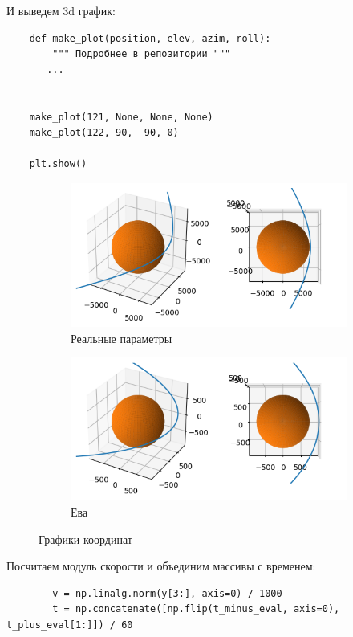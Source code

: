 \documentclass{article}
\begin{document}
    И выведем 3d график:
    \begin{verbatim}
    def make_plot(position, elev, azim, roll):
        """ Подробнее в репозитории """
       ...

       
    make_plot(121, None, None, None)
    make_plot(122, 90, -90, 0)
    
    plt.show()
    \end{verbatim}
    \begin{figure}
    \begin{subfigure}{0.5\textwidth}
        \includegraphics[width=1\linewidth]{images/coordinates_graph.png}
        \caption{Реальные параметры}
    \end{subfigure}
    \begin{subfigure}{0.5\textwidth}
        \includegraphics[width=1\linewidth]{images/eve_coordinates.png}
        \caption{Ева}
        \label{fig:enter-label}
    \end{subfigure}
    \caption{Графики координат}
    \end{figure}
    Посчитаем модуль скорости и объединим массивы с временем:
    \begin{verbatim}
        v = np.linalg.norm(y[3:], axis=0) / 1000
        t = np.concatenate([np.flip(t_minus_eval, axis=0), t_plus_eval[1:]]) / 60
    \end{verbatim}
\end{document}
